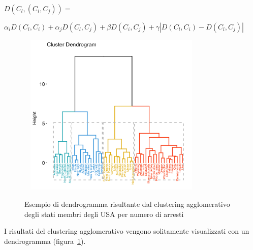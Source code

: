 \documentclass[\main/main.tex]{subfiles}
\begin{document}
$ D(C_l,(C_i,C_j)) = $
\begin{flushright}
	$\alpha_i D(C_l,C_i)+ \alpha_j D(C_l,C_j) + \beta D(C_i,C_j) + \gamma \left| D(C_l,C_i)-D(C_l,C_j) \right| $
\end{flushright}
\begin{figure} \centering
	\caption{Esempio di dendrogramma risultante dal clustering agglomerativo degli stati membri degli USA per numero di arresti}
	\label{fig:hcdendrogram}
	\ \newline
	\includegraphics[width=0.75\textwidth,trim={1.5in 0.25in 0 1.25in},clip]{../images/hcdendrogram.png}
\end{figure}
I risultati del clustering agglomerativo vengono solitamente visualizzati con un dendrogramma (figura~\ref{fig:hcdendrogram}).
\end{document}
